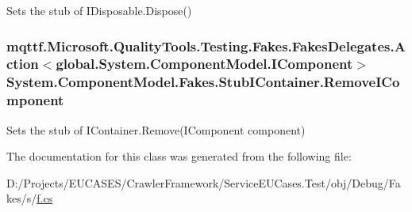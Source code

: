 Sets the stub of I\-Disposable.\-Dispose()

\hypertarget{class_system_1_1_component_model_1_1_fakes_1_1_stub_i_container_a2932887c119d470c005fac1e585755a3}{
\subsubsection[{Remove\-I\-Component}]{\setlength{\rightskip}{0pt plus 5cm}mqttf.\-Microsoft.\-Quality\-Tools.\-Testing.\-Fakes.\-Fakes\-Delegates.\-Action$<$global.\-System.\-Component\-Model.\-I\-Component$>$ System.\-Component\-Model.\-Fakes.\-Stub\-I\-Container.\-Remove\-I\-Component}}\label{class_system_1_1_component_model_1_1_fakes_1_1_stub_i_container_a2932887c119d470c005fac1e585755a3}


Sets the stub of I\-Container.\-Remove(\-I\-Component component)



The documentation for this class was generated from the following file\-:\begin{DoxyCompactItemize}
\item 
D\-:/\-Projects/\-E\-U\-C\-A\-S\-E\-S/\-Crawler\-Framework/\-Service\-E\-U\-Cases.\-Test/obj/\-Debug/\-Fakes/s/\hyperlink{s_2f_8cs}{f.\-cs}\end{DoxyCompactItemize}
